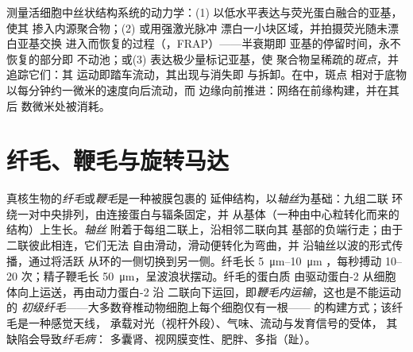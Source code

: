 \begin{method}[观察聚合物的更替]\label{met:b3:cytoskeleton-motility:frap}
测量活细胞中丝状结构系统的动力学：(1)
以低水平表达与荧光蛋白融合的亚基，使其
掺入内源聚合物；(2) 或用强激光脉冲
漂白一小块区域，并拍摄荧光随未漂白亚基交换
进入而恢复的过程（\emph{}，FRAP）——半衰期即
亚基的停留时间，永不恢复的部分即
不动池；或(3) 表达极少量标记亚基，使
聚合物呈稀疏的\emph{斑点}，并追踪它们：其
运动即踏车流动，其出现与消失即
与拆卸。在中，斑点
相对于底物以每分钟约一微米的速度向后流动，而
边缘向前推进：网络在前缘构建，并在其后
数微米处被消耗。
\end{method}

\section{纤毛、鞭毛与旋转马达}

\begin{definition}[纤毛与鞭毛]\label{def:b3:cytoskeleton-motility:cilia}
真核生物的\emph{纤毛}或\emph{鞭毛}是一种被膜包裹的
延伸结构，以\emph{轴丝}为基础：九组二联
环绕一对中央排列，由连接蛋白与辐条固定，并
从基体（一种由中心粒转化而来的结构）上生长。\emph{轴丝}
附着于每组二联上，沿相邻二联向其
基部的负端行走；由于二联彼此相连，它们无法
自由滑动，滑动便转化为弯曲，并
沿轴丝以波的形式传播，通过将活跃
从环的一侧切换到另一侧。纤毛长 \qtyrange{5}{10}{\micro m}
，每秒搏动 \numrange{10}{20} 次；精子鞭毛长
\qty{50}{\micro m}，呈波浪状摆动。纤毛的蛋白质
由驱动蛋白-2 从细胞体向上运送，再由动力蛋白-2 沿
二联向下运回，即\emph{鞭毛内运输}，这也是不能运动的
\emph{初级纤毛}——大多数脊椎动物细胞上每个细胞仅有一根——
的构建方式；该纤毛是一种感觉天线，
承载对光（视杆外段）、气味、流动与发育信号的受体，
其缺陷会导致\emph{纤毛病}：
多囊肾、视网膜变性、肥胖、多指（趾）。
\end{definition}

